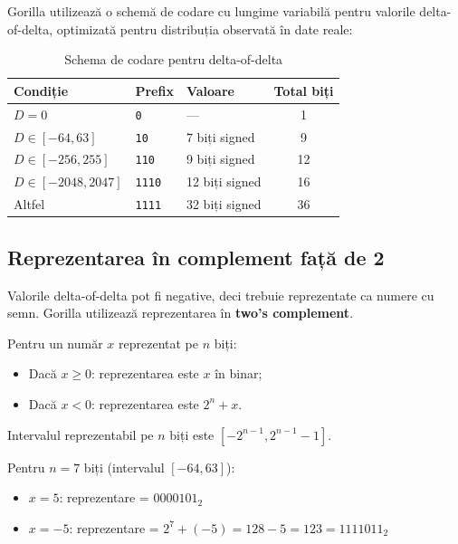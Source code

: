 Gorilla utilizează o schemă de codare cu lungime variabilă pentru valorile delta-of-delta, optimizată pentru distribuția observată în date reale:

\begin{table}[h]
\centering
\begin{tabular}{@{}lllc@{}}
\toprule
\textbf{Condiție} & \textbf{Prefix} & \textbf{Valoare} & \textbf{Total biți} \\
\midrule
$D = 0$ & \texttt{0} & --- & 1 \\
$D \in [-64, 63]$ & \texttt{10} & 7 biți signed & 9 \\
$D \in [-256, 255]$ & \texttt{110} & 9 biți signed & 12 \\
$D \in [-2048, 2047]$ & \texttt{1110} & 12 biți signed & 16 \\
Altfel & \texttt{1111} & 32 biți signed & 36 \\
\bottomrule
\end{tabular}
\caption{Schema de codare pentru delta-of-delta}
\label{tab:dod-encoding}
\end{table}

\subsection{Reprezentarea în complement față de 2}

Valorile delta-of-delta pot fi negative, deci trebuie reprezentate ca numere cu semn. Gorilla utilizează reprezentarea în \textbf{two's complement}.

Pentru un număr $x$ reprezentat pe $n$ biți:
\begin{itemize}
    \item Dacă $x \geq 0$: reprezentarea este $x$ în binar;
    \item Dacă $x < 0$: reprezentarea este $2^n + x$.
\end{itemize}

Intervalul reprezentabil pe $n$ biți este $[-2^{n-1}, 2^{n-1} - 1]$.

\begin{example}
Pentru $n = 7$ biți (intervalul $[-64, 63]$):
\begin{itemize}
    \item $x = 5$: reprezentare = $0000101_2$
    \item $x = -5$: reprezentare = $2^7 + (-5) = 128 - 5 = 123 = 1111011_2$
\end{itemize}
\end{example}

